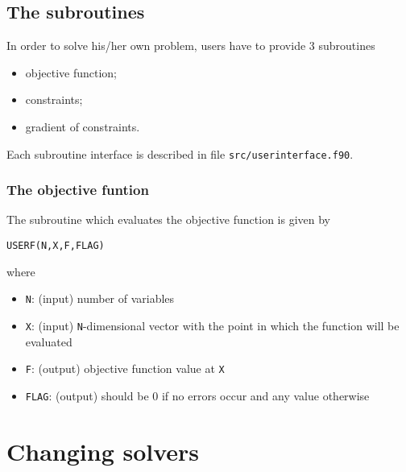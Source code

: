 \documentclass[a4paper,12pt]{article}
\begin{document}
\subsection{The subroutines}

In order to solve his/her own problem, users have to provide 3
subroutines
\begin{itemize}
\item objective function;
\item constraints;
\item gradient of constraints.
\end{itemize}
Each subroutine interface is described in file
\verb+src/userinterface.f90+.

\subsubsection{The objective funtion}

The subroutine which evaluates the objective function is given by
\begin{center}
\verb+USERF(N,X,F,FLAG)+
\end{center}
where
\begin{itemize}
\item \verb+N+: (input) number of variables
\item \verb+X+: (input) \verb+N+-dimensional vector with the point in
  which the function will be evaluated
\item \verb+F+: (output) objective function value at \verb+X+
\item \verb+FLAG+: (output) should be 0 if no errors occur and any
  value otherwise
\end{itemize}

\section{Changing solvers} \label{solvers}



\end{document}

